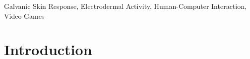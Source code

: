 \documentclass[12pt,a4paper]{article}
\begin{document}
\begin{keywords}
Galvanic Skin Response, Electrodermal Activity, Human-Computer Interaction, Video Games
\end{keywords}

\section{Introduction}

\end{document}
